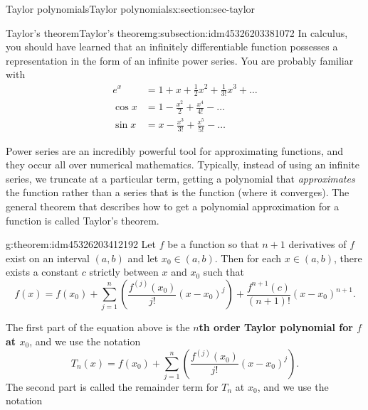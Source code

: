 \documentclass[oneside,10pt,]{article}
\newcommand{\terminology}[1]{\textbf{#1}}
\numberwithin{equation}{section}
\numberwithin{equation}{section}
\newcommand{\amp}{&}
\begin{document}
%
%
\typeout{************************************************}
\typeout{************************************************}
%
\begin{sectionptx}{Taylor polynomials}{}{Taylor polynomials}{}{}{x:section:sec-taylor}
%
%
\typeout{************************************************}
\typeout{************************************************}
%
\begin{subsectionptx}{Taylor's theorem}{}{Taylor's theorem}{}{}{g:subsection:idm45326203381072}
In calculus, you should have learned that an infinitely differentiable function possesses a representation in the form of an infinite power series. You are probably familiar with%
\begin{align*}
e^x \amp = 1 + x + \frac{1}{2}x^2 + \frac{1}{3!}x^3 + \ldots \\
\cos x \amp = 1 - \frac{x^2}{2} + \frac{x^4}{4!} - \ldots \\
\sin x \amp = x - \frac{x^3}{3!} + \frac{x^5}{5!} - \ldots 
\end{align*}
%
\par
Power series are an incredibly powerful tool for approximating functions, and they occur all over numerical mathematics. Typically, instead of using an infinite series, we truncate at a particular term, getting a polynomial that \emph{approximates} the function rather than a series that is the function (where it converges). The general theorem that describes how to get a polynomial approximation for a function is called Taylor's theorem.%
\begin{theorem}{}{}{g:theorem:idm45326203412192}%
Let \(f\) be a function so that \(n + 1\) derivatives of \(f\) exist on an interval \((a, b)\) and let \(x_0 \in (a,b)\). Then for each \(x \in (a,b)\), there exists a constant \(c\) strictly between \(x\) and \(x_0\) such that%
\begin{equation*}
f(x) = f(x_0) + \sum_{j=1}^n \left( \frac{f^{(j)}(x_0)}{j!}(x - x_0)^j\right) + \frac{f^{n+1}(c)}{(n+1)!}(x - x_0)^{n+1}.
\end{equation*}
%
\end{theorem}
The first part of the equation above is the \terminology{\(n\)th order Taylor polynomial for \(f\) at \(x_0\)}, and we use the notation%
\begin{equation*}
T_n(x) = f(x_0) + \sum_{j=1}^n \left( \frac{f^{(j)}(x_0)}{j!}(x - x_0)^j\right).
\end{equation*}
The second part is called the remainder term for \(T_n\) at \(x_0\), and we use the notation%

\end{subsectionptx}
\end{sectionptx}
\end{document}
